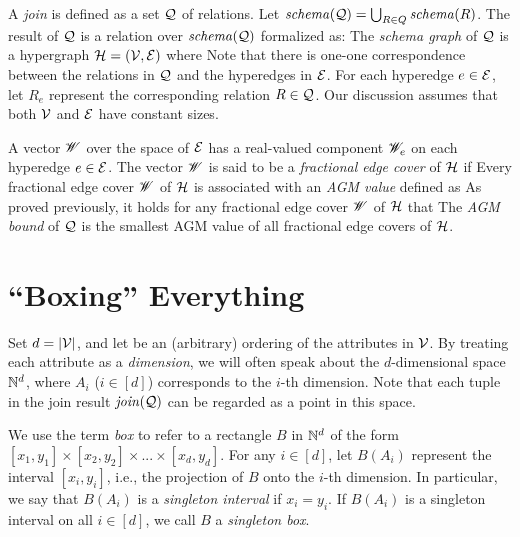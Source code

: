 \vgap

A {\em join} is defined as a set $\mathcal{Q}$ of relations. Let $\mathit{schema}(\mathcal{Q}) = \bigcup_{R \in Q} \mathit{schema}(R)$. The result of $\mathcal{Q}$ is a relation over $\mathit{schema}(\mathcal{Q})$ formalized as:
The {\em schema graph} of $\mathcal{Q}$ is a hypergraph $\mathcal{H} = (\mathcal{V}, \mathcal{E})$ where
Note that there is one-one correspondence between the relations in $\mathcal{Q}$ and the hyperedges in $\mathcal{E}$. For each hyperedge $e \in \mathcal{E}$, let $R_e$ represent the corresponding relation $R \in \mathcal{Q}$. Our discussion assumes that both $\mathcal{V}$ and $\mathcal{E}$ have constant sizes.

\vgap

A vector $\mathscr{W}$ over the space of $\mathcal{E}$ has a real-valued component $\mathscr{W}_e$ on each hyperedge $e \in \mathcal{E}$. The vector $\mathscr{W}$ is said to be a {\em fractional edge cover} of $\mathcal{H}$ if
Every fractional edge cover $\mathscr{W}$ of $\mathcal{H}$ is associated with an {\em AGM value} defined as
As proved previously, it holds for any fractional edge cover $\mathscr{W}$ of $\mathcal{H}$ that
The {\em AGM bound} of $\mathcal{Q}$ is the smallest AGM value of all fractional edge covers of $\mathcal{H}$.

\section{``Boxing'' Everything} \label{sec:split:box}

Set $d = |\mathcal{V}|$, and let
be an (arbitrary) ordering of the attributes in $\mathcal{V}$. By treating each attribute as a {\em dimension}, we will often speak about the $d$-dimensional space $\mathbb{N}^d$, where $A_i$ ($i \in [d]$) corresponds to the $i$-th dimension. Note that each tuple in the join result $\mathit{join}(\mathcal{Q})$ can be regarded as a point in this space.

\vgap

We use the term {\em box} to refer to a rectangle $B$ in $\mathbb{N}^d$ of the form $[x_1, y_1] \times [x_2, y_2] \times ... \times [x_d, y_d]$. For any $i \in [d]$, let $B(A_i)$ represent the interval $[x_i, y_i]$, i.e., the projection of $B$ onto the $i$-th dimension. In particular, we say that $B(A_i)$ is a {\em singleton interval} if $x_i = y_i$. If $B(A_i)$ is a singleton interval on all $i \in [d]$, we call $B$ a  {\em singleton box}.

